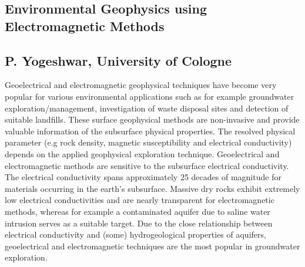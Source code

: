 \subsection*{Environmental Geophysics using Electromagnetic Methods}
\subsection*{P. Yogeshwar, University of  Cologne}
\noindent
Geoelectrical and electromagnetic geophysical techniques have become very popular for various environmental applications such as for example groundwater exploration/management, investigation of waste disposal sites and detection of suitable landfills. These surface geophysical methods are non-invasive and provide valuable information of the subsurface physical properties. The resolved physical parameter (e.g rock density, magnetic susceptibility and electrical conductivity) depends on the applied geophysical exploration technique. Geoelectrical and electromagnetic methods are sensitive to the subsurface electrical conductivity. The electrical conductivity spans approximately 25 decades of magnitude for materials occurring in the earth's subsurface. Massive dry rocks exhibit extremely low electrical conductivities and are nearly transparent for electromagnetic methods, whereas for example a contaminated aquifer due to saline water intrusion serves as a suitable target. Due to the close relationship between electrical conductivity and (some) hydrogeological properties of aquifers, geoelectrical and electromagnetic techniques are the most popular in groundwater exploration.\\
